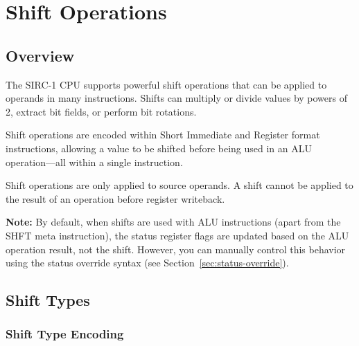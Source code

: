 \chapter{Shift Operations}
\label{ch:shift-operations}

\section{Overview}

The SIRC-1 CPU supports powerful shift operations that can be applied to operands in many instructions. Shifts can
multiply or divide values by powers of 2, extract bit fields, or perform bit rotations.

Shift operations are encoded within Short Immediate and Register format instructions, allowing a value to be shifted
before being used in an ALU operation—all within a single instruction.

Shift operations are only applied to source operands. A shift cannot be applied to the result of an
operation before register writeback.

\textbf{Note:} By default, when shifts are used with ALU instructions (apart from the SHFT meta instruction), the status register flags are updated based on the ALU operation result, not the shift. However, you can manually control this behavior using the status override syntax (see Section~\ref{sec:status-override}).

\section{Shift Types}

\subsection{Shift Type Encoding}

